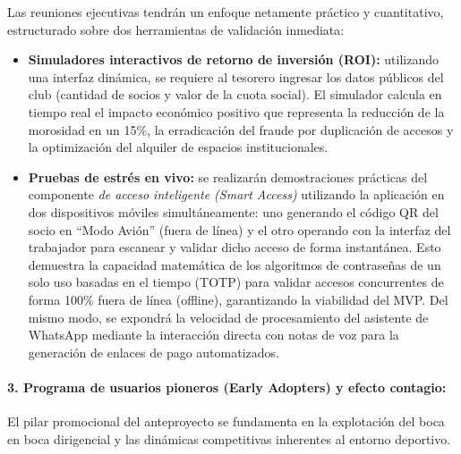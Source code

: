 Las reuniones ejecutivas tendrán un enfoque netamente práctico y cuantitativo, estructurado sobre dos herramientas de validación inmediata:
\begin{itemize}
    \item \textbf{Simuladores interactivos de retorno de inversión (ROI):} utilizando una interfaz dinámica, se requiere al tesorero ingresar los datos públicos del club (cantidad de socios y valor de la cuota social). El simulador calcula en tiempo real el impacto económico positivo que representa la reducción de la morosidad en un 15\%, la erradicación del fraude por duplicación de accesos y la optimización del alquiler de espacios institucionales.
    \item \textbf{Pruebas de estrés en vivo:} se realizarán demostraciones prácticas del componente \textit{de acceso inteligente (Smart Access)} utilizando la aplicación en dos dispositivos móviles simultáneamente: uno generando el código QR del socio en ``Modo Avión'' (fuera de línea) y el otro operando con la interfaz del trabajador para escanear y validar dicho acceso de forma instantánea. Esto demuestra la capacidad matemática de los algoritmos de contraseñas de un solo uso basadas en el tiempo (TOTP) para validar accesos concurrentes de forma 100\% fuera de línea (offline), garantizando la viabilidad del MVP. Del mismo modo, se expondrá la velocidad de procesamiento del asistente de WhatsApp mediante la interacción directa con notas de voz para la generación de enlaces de pago automatizados.
\end{itemize}

\paragraph{3. Programa de usuarios pioneros (Early Adopters) y efecto contagio:} El pilar promocional del anteproyecto se fundamenta en la explotación del boca en boca dirigencial y las dinámicas competitivas inherentes al entorno deportivo.

